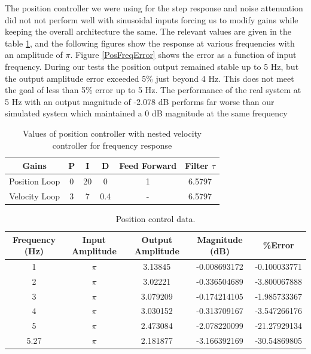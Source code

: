 \documentclass{article}
\theoremstyle{plain}
\theoremstyle{definition}
\theoremstyle{remark}
\begin{document}
The position controller we were using for the step response and noise attenuation did not not perform well with sinusoidal inputs forcing us to modify gains while keeping the overall architecture the same. The relevant values are given in the table \ref{positionFreqGains}, and the following figures show the response at various frequencies with an amplitude of $\pi$. Figure \ref{PosFreqError} shows the error as a function of input frequency. During our tests the position output remained stable up to 5 Hz, but the output amplitude error exceeded 5\% just beyond 4 Hz. This does not meet the goal of less than 5\% error up to 5 Hz.  The performance of the real system at 5 Hz with an output magnitude of -2.078 dB performs far worse than our simulated system which maintained a 0 dB magnitude at the same frequency \\

\begin{table}[htb]
\begin{center}
    \begin{tabular}{|c|c|c|c|c|c|}
        \hline
        Gains & P   & I & D   & Feed Forward   & Filter $\tau$   \\ \hline
        Position Loop            & 0 & 20  & 0 & 1 & 6.5797    \\ 
        Velocity Loop       & 3   & 7    & 0.4   & -  & 6.5797  \\ 
       \hline
    \end{tabular}
\end{center}
\caption{Values of position controller with nested velocity controller for frequency response}
\label{positionFreqGains}
\end{table}

\begin{table}[htb]
    \begin{tabular}{|c|c|c|c|c|}
        \hline
        Frequency (Hz) & Input Amplitude & Output Amplitude & Magnitude (dB) & \%Error       \\ \hline
        1              & $\pi$           & 3.13845          & -0.008693172   & -0.100033771 \\ 
        2              & $\pi$           & 3.02221          & -0.336504689   & -3.800067888 \\ 
        3              & $\pi$           & 3.079209         & -0.174214105   & -1.985733367 \\ 
        4              & $\pi$           & 3.030152         & -0.313709167   & -3.547266176 \\ 
        5              & $\pi$           & 2.473084         & -2.078220099   & -21.27929134 \\ 
        5.27           & $\pi$           & 2.181877         & -3.166392169   & -30.54869805 \\
        \hline
    \end{tabular}
    \caption{Position control data.}
    \label{q4_atable}
\end{table}
\end{document}
